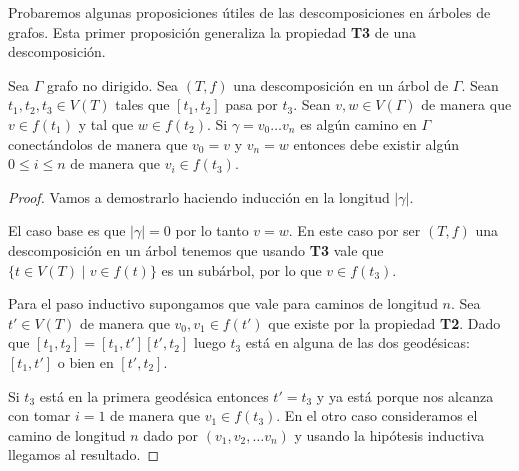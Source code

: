 \documentclass[tesis.tex]{subfiles}
\begin{document}
	


Probaremos algunas proposiciones útiles de las descomposiciones en árboles de grafos.
Esta primer proposición generaliza la propiedad \textbf{T3} de una descomposición.
\begin{prop}\label{prop-camino-desc}
	Sea $\Gamma$ grafo no dirigido.
	Sea $(T,f)$ una descomposición en un árbol de $\Gamma$.
	Sean $t_{1},t_{2},t_{3} \in V(T)$ tales que $[t_1,t_2]$ pasa por $t_{3}$.
	Sean $v,w \in V(\Gamma)$ de manera que $v \in f(t_{1})$ y tal que $w \in f(t_{2})$.
	Si $\gamma = v_0 \dots v_n$ es algún camino en $\Gamma$ conectándolos de manera que $v_{0}=v$ y $v_{n} = w$	
	entonces debe existir algún $ 0 \le i \le n$ de manera que $v_i \in f(t_{3})$. 
\end{prop}

\begin{proof}	
	Vamos a demostrarlo haciendo inducción en la longitud $|\gamma|$.
	 
	El caso base es que $|\gamma| = 0$ por lo tanto $v=w$. 
	En este caso por ser $(T,f)$ una descomposición en un árbol tenemos que usando \textbf{T3} vale que $\{  t \in V(T) \mid v \in f(t) \}$ es un subárbol, por lo que $v \in f(t_{3})$.
	
	Para el paso inductivo supongamos que vale para caminos de longitud $n$.
	Sea $t' \in V(T)$ de manera que $v_{0}, v_{1} \in f(t')$ que existe por la propiedad \textbf{T2}.
	Dado que 
	$[t_{1}, t_{2}] = [t_{1}, t'][t',t_{2}]$
	luego $t_{3}$ está en alguna de las dos geodésicas: $[t_{1},t']$ o bien en  $[t',t_{2}]$.
	
	Si $t_{3}$ está en la primera geodésica entonces $t' = t_{3}$ y ya está porque nos alcanza con tomar $i=1$ de manera que $v_1 \in f(t_{3})$.
	En el otro caso consideramos el camino de longitud $n$ dado por $(v_1, v_2, \dots v_n)$ y usando la hipótesis inductiva llegamos al resultado.	
\end{proof}
\end{document}
